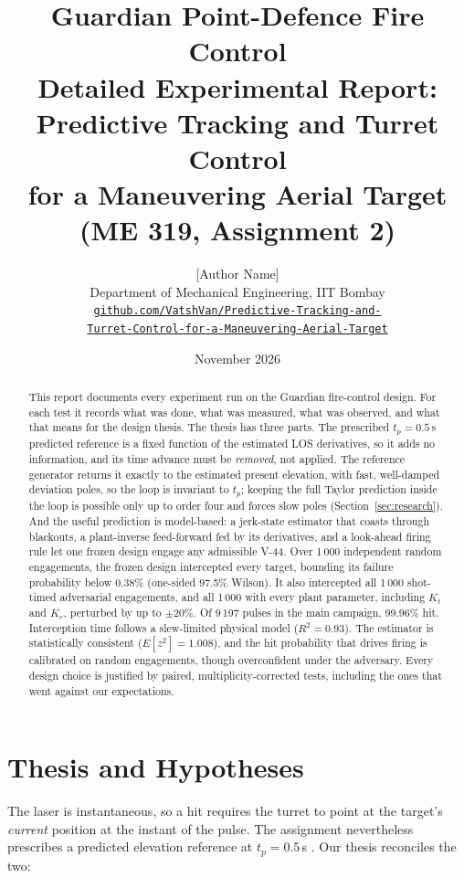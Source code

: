 \documentclass[11pt,a4paper]{article}
\title{\textbf{Guardian Point-Defence Fire Control}\\[4pt]
\large Detailed Experimental Report: Predictive Tracking and Turret Control\\ for a Maneuvering Aerial Target (ME 319, Assignment 2)}
\author{[Author Name]\\ Department of Mechanical Engineering, IIT Bombay\\
\small\href{https://github.com/VatshVan/Predictive-Tracking-and-Turret-Control-for-a-Maneuvering-Aerial-Target}{\texttt{github.com/VatshVan/Predictive-Tracking-and-}}\\
\small\href{https://github.com/VatshVan/Predictive-Tracking-and-Turret-Control-for-a-Maneuvering-Aerial-Target}{\texttt{Turret-Control-for-a-Maneuvering-Aerial-Target}}}
\date{November 2026}
\begin{document}
\maketitle

\begin{abstract}
\noindent This report documents every experiment run on the Guardian fire-control design. For each test it records what was done, what was measured, what was observed, and what that means for the design thesis. The thesis has three parts. The prescribed $t_p=0.5$\,s predicted reference is a fixed function of the estimated LOS derivatives, so it adds no information, and its time advance must be \emph{removed}, not applied. The reference generator returns it exactly to the estimated present elevation, with fast, well-damped deviation poles, so the loop is invariant to $t_p$; keeping the full Taylor prediction inside the loop is possible only up to order four and forces slow poles (Section~\ref{sec:research}). And the useful prediction is model-based: a jerk-state estimator that coasts through blackouts, a plant-inverse feed-forward fed by its derivatives, and a look-ahead firing rule let one frozen design engage any admissible V-44.
Over 1\,000 independent random engagements, the frozen design intercepted every target, bounding its failure probability below 0.38\% (one-sided 97.5\% Wilson). It also intercepted all 1\,000 shot-timed adversarial engagements, and all 1\,000 with every plant parameter, including $K_t$ and $K_e$, perturbed by up to $\pm20\%$. Of 9\,197 pulses in the main campaign, 99.96\% hit. Interception time follows a slew-limited physical model ($R^2=0.93$). The estimator is statistically consistent ($E[z^2]=1.008$), and the hit probability that drives firing is calibrated on random engagements, though overconfident under the adversary. Every design choice is justified by paired, multiplicity-corrected tests, including the ones that went against our expectations.
\end{abstract}

\tableofcontents
\newpage

\section{Thesis and Hypotheses}
\label{sec:thesis}
The laser is instantaneous, so a hit requires the turret to point at the target's \emph{current} position at the instant of the pulse. The assignment nevertheless prescribes a predicted elevation reference at $t_p=0.5$\,s \cite{spec2026}. Our thesis reconciles the two:
\end{document}
